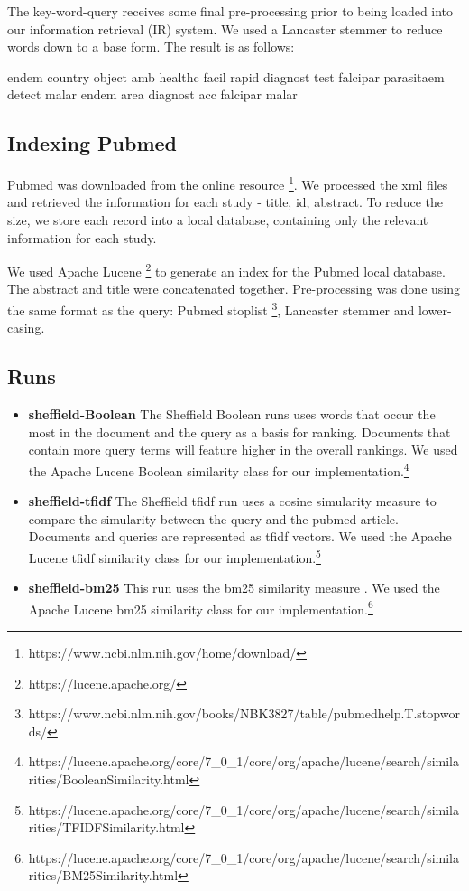 The key-word-query receives some final pre-processing prior to being loaded into our information retrieval (IR) system. We used a Lancaster stemmer to reduce words down to a base form. The result is as follows:

\begin{tcolorbox}

endem country object amb healthc facil rapid diagnost test falcipar parasitaem detect malar endem area diagnost acc falcipar malar

\end{tcolorbox}

\subsection{Indexing Pubmed}

Pubmed was downloaded from the online resource \footnote{https://www.ncbi.nlm.nih.gov/home/download/}. We processed the xml files and retrieved the information for each study - title, id, abstract. To reduce the size, we store each record into a local database, containing only the relevant information for each study.

We used Apache Lucene \footnote{https://lucene.apache.org/} to generate an index for the Pubmed local database. The abstract and title were concatenated together. Pre-processing was done using the same format as the query: Pubmed stoplist \footnote{https://www.ncbi.nlm.nih.gov/books/NBK3827/table/pubmedhelp.T.stopwords/}, Lancaster stemmer and lower-casing. 


\subsection{Runs}

\begin{itemize}
\item \textbf{sheffield-Boolean}  
The Sheffield Boolean runs uses words that occur the most in the document and the query as a basis for ranking. Documents that contain more query terms will feature higher in the overall rankings. We used the Apache Lucene Boolean similarity class for our implementation.\footnote{https://lucene.apache.org/core/7\_0\_1/core/org/apache/lucene/search/similarities/BooleanSimilarity.html}

\item \textbf{sheffield-tfidf} The Sheffield tfidf run uses a cosine simularity measure to compare the simularity between the query and the pubmed article. Documents and queries are represented as tfidf vectors. We used the Apache Lucene tfidf similarity class for our implementation.\footnote{https://lucene.apache.org/core/7\_0\_1/core/org/apache/lucene/search/similarities/TFIDFSimilarity.html}

\item \textbf{sheffield-bm25} This run uses the bm25 similarity measure \cite{Robertson96okapiat}. We used the Apache Lucene bm25 similarity class for our implementation.\footnote{https://lucene.apache.org/core/7\_0\_1/core/org/apache/lucene/search/similarities/BM25Similarity.html}

\end{itemize}

